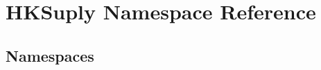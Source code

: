 \hypertarget{namespace_h_k_suply}{}\section{H\+K\+Suply Namespace Reference}
\label{namespace_h_k_suply}
\subsection*{Namespaces}
\begin{DoxyCompactItemize}
\end{DoxyCompactItemize}
